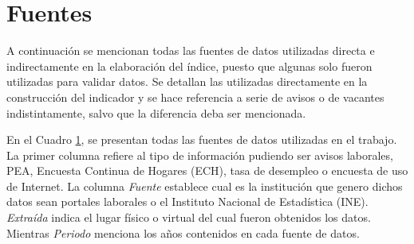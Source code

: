 \documentclass[12pt,oneside]{reedthesis}
\begin{document}
\hypertarget{fuentes}{%
\section{Fuentes}\label{fuentes}}

A continuación se mencionan todas las fuentes de datos utilizadas directa e indirectamente en la elaboración del índice, puesto que algunas solo fueron utilizadas para validar datos. Se detallan las utilizadas directamente en la construcción del indicador y se hace referencia a serie de avisos o de vacantes indistintamente, salvo que la diferencia deba ser mencionada.

En el Cuadro \ref{fuentes}, se presentan todas las fuentes de datos utilizadas en el trabajo. La primer columna refiere al tipo de información pudiendo ser avisos laborales, PEA, Encuesta Continua de Hogares (ECH), tasa de desempleo o encuesta de uso de Internet. La columna \emph{Fuente}
establece cual es la institución que genero dichos datos sean portales laborales o el Instituto Nacional de Estadística (INE). \emph{Extraída} indica el lugar físico o virtual del cual fueron obtenidos los datos. Mientras \emph{Periodo} menciona los años contenidos en cada fuente de datos.
\end{document}
